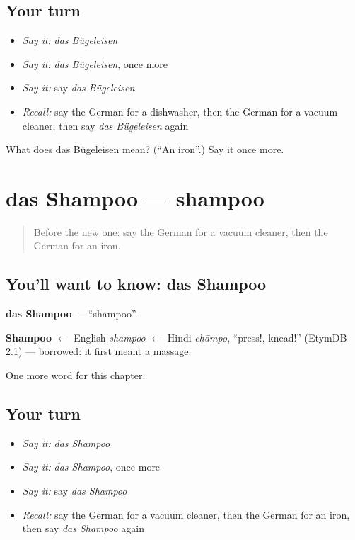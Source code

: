 \subsection*{Your turn}
\begin{itemize}
\raggedright
  \item \emph{Say it:} \emph{das Bügeleisen}
  \item \emph{Say it:} \emph{das Bügeleisen}, once more
  \item \emph{Say it:} say \emph{das Bügeleisen}
  \item \emph{Recall:} say the German for a dishwasher, then the German for a vacuum cleaner, then say \emph{das Bügeleisen} again
\end{itemize}

\begin{tcolorbox}[breakable,colback=teal!4,colframe=teal!35!black,title={Before you move on}]
What does das Bügeleisen mean? (\textquotedblleft{}An iron\textquotedblright{}.) Say it once more.
\end{tcolorbox}
\section[das Shampoo]{das Shampoo — shampoo}

\label{lesson:GE-C202-shampoo}



\begin{quote}
Before the new one: say the German for a vacuum cleaner, then the German for an iron.
\end{quote}

\subsection*{You'll want to know: das Shampoo}
\textbf{das Shampoo} — \textquotedblleft{}shampoo\textquotedblright{}.

\begin{cousinweb}
\textbf{Shampoo} $\leftarrow$ English \emph{shampoo} $\leftarrow$ Hindi \emph{chāmpo}, \textquotedblleft{}press!, knead!\textquotedblright{} (EtymDB 2.1) — borrowed: it first meant a massage.
\end{cousinweb}

\begin{grammarlens}[title={What you've built}]
One more word for this chapter.
\end{grammarlens}

\subsection*{Your turn}
\begin{itemize}
\raggedright
  \item \emph{Say it:} \emph{das Shampoo}
  \item \emph{Say it:} \emph{das Shampoo}, once more
  \item \emph{Say it:} say \emph{das Shampoo}
  \item \emph{Recall:} say the German for a vacuum cleaner, then the German for an iron, then say \emph{das Shampoo} again
\end{itemize}

